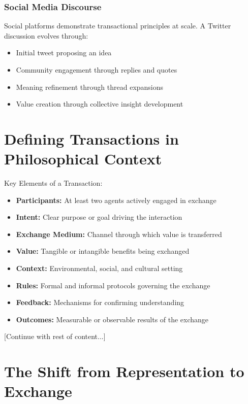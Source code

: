 \documentclass[12pt]{article}
\begin{document}
\subsubsection{Social Media Discourse}
Social platforms demonstrate transactional principles at scale. A Twitter discussion evolves through:
\begin{itemize}
\item Initial tweet proposing an idea
\item Community engagement through replies and quotes
\item Meaning refinement through thread expansions
\item Value creation through collective insight development
\end{itemize}

\section{Defining Transactions in Philosophical Context}

\begin{tcolorbox}[featurebox, title=Transaction Components]
Key Elements of a Transaction:
\begin{itemize}[label=$\bullet$]
\item \textbf{Participants:} At least two agents actively engaged in exchange
\item \textbf{Intent:} Clear purpose or goal driving the interaction
\item \textbf{Exchange Medium:} Channel through which value is transferred
\item \textbf{Value:} Tangible or intangible benefits being exchanged
\item \textbf{Context:} Environmental, social, and cultural setting
\item \textbf{Rules:} Formal and informal protocols governing the exchange
\item \textbf{Feedback:} Mechanisms for confirming understanding
\item \textbf{Outcomes:} Measurable or observable results of the exchange
\end{itemize}
\end{tcolorbox}

[Continue with rest of content...]

\section{The Shift from Representation to Exchange}
\end{document}
